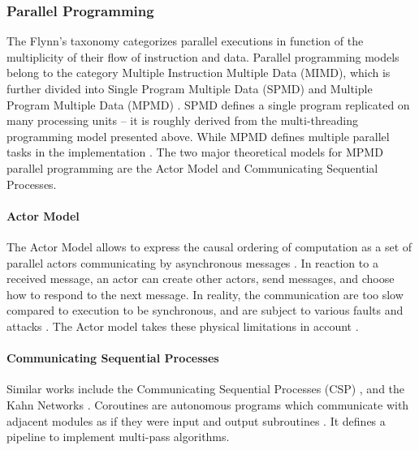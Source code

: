 \subsubsection{Parallel Programming} \label{chapter3:software-efficiency:concurrency:parallel-programming}

The Flynn's taxonomy \cite{Flynn1972} categorizes parallel executions in function of the multiplicity of their flow of instruction and data.
Parallel programming models belong to the category Multiple Instruction Multiple Data (MIMD), which is further divided into Single Program Multiple Data (SPMD) \cite{Auguin1983,Darema1988,Darema2001} and Multiple Program Multiple Data (MPMD) \cite{Chang1997,Chan2004}.
SPMD defines a single program replicated on many processing units \cite{Culler,Johnson1995,K.ManiChandy2005} -- it is roughly derived from the multi-threading programming model presented above.
While MPMD defines multiple parallel tasks in the implementation \cite{Grimshaw1991,Foster1995b,Foster1996}.
The two major theoretical models for MPMD parallel programming are the Actor Model and Communicating Sequential Processes.


\paragraph{Actor Model}

The Actor Model allows to express the causal ordering of computation as a set of parallel actors communicating by asynchronous messages \cite{Hewitt1973a, Hewitt1977, Clinger1981}.
In reaction to a received message, an actor can create other actors, send messages, and choose how to respond to the next message.
In reality, the communication are too slow compared to execution to be synchronous, and are subject to various faults and attacks \cite{Lamport1982}.
The Actor model takes these physical limitations in account \cite{Hewitt1977a}.
\paragraph{Communicating Sequential Processes}

Similar works include the Communicating Sequential Processes (CSP) \cite{Hoare1978, Brookes1984}, and the Kahn Networks \cite{Kahn1974, Kahn1976}.
Coroutines are autonomous programs which communicate with adjacent modules as if they were input and output subroutines \cite{Conway1963}.
It defines a pipeline to implement multi-pass algorithms.

